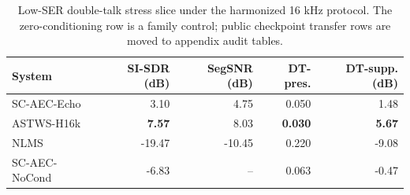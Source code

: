 \begin{table}[!t]
\caption{Low-SER double-talk stress slice under the harmonized 16 kHz protocol. The zero-conditioning row is a family control; public checkpoint transfer rows are moved to appendix audit tables.}
\label{tab:low-ser-main}
\centering
\scriptsize
\begin{tabular}{@{}lrrrr@{}}
\hline
System & SI-SDR (dB) & SegSNR (dB) & DT-pres. & DT-supp. (dB) \\
\hline
SC-AEC-Echo & 3.10 & 4.75 & 0.050 & 1.48 \\
ASTWS-H16k~\cite{zhao2024astws} & \textbf{7.57} & 8.03 & \textbf{0.030} & \textbf{5.67} \\
NLMS & -19.47 & -10.45 & 0.220 & -9.08 \\
SC-AEC-NoCond & -6.83 & -- & 0.063 & -0.47 \\
\hline
\end{tabular}
\end{table}

